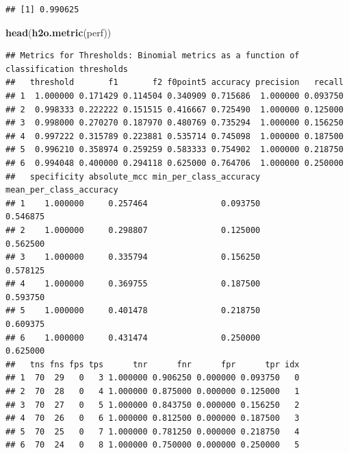 \documentclass[]{article}
\newenvironment{Shaded}{\begin{snugshade}}{\end{snugshade}}
\newcommand{\KeywordTok}[1]{\textcolor[rgb]{0.13,0.29,0.53}{\textbf{{#1}}}}
\newcommand{\DataTypeTok}[1]{\textcolor[rgb]{0.13,0.29,0.53}{{#1}}}
\newcommand{\StringTok}[1]{\textcolor[rgb]{0.31,0.60,0.02}{{#1}}}
\newcommand{\NormalTok}[1]{{#1}}
\begin{document}
\begin{verbatim}
## [1] 0.990625
\end{verbatim}

\begin{Shaded}
\begin{Highlighting}[]
\KeywordTok{head}\NormalTok{(}\KeywordTok{h2o.metric}\NormalTok{(perf))}
\end{Highlighting}
\end{Shaded}

\begin{verbatim}
## Metrics for Thresholds: Binomial metrics as a function of classification thresholds
##   threshold       f1       f2 f0point5 accuracy precision   recall
## 1  1.000000 0.171429 0.114504 0.340909 0.715686  1.000000 0.093750
## 2  0.998333 0.222222 0.151515 0.416667 0.725490  1.000000 0.125000
## 3  0.998000 0.270270 0.187970 0.480769 0.735294  1.000000 0.156250
## 4  0.997222 0.315789 0.223881 0.535714 0.745098  1.000000 0.187500
## 5  0.996210 0.358974 0.259259 0.583333 0.754902  1.000000 0.218750
## 6  0.994048 0.400000 0.294118 0.625000 0.764706  1.000000 0.250000
##   specificity absolute_mcc min_per_class_accuracy mean_per_class_accuracy
## 1    1.000000     0.257464               0.093750                0.546875
## 2    1.000000     0.298807               0.125000                0.562500
## 3    1.000000     0.335794               0.156250                0.578125
## 4    1.000000     0.369755               0.187500                0.593750
## 5    1.000000     0.401478               0.218750                0.609375
## 6    1.000000     0.431474               0.250000                0.625000
##   tns fns fps tps      tnr      fnr      fpr      tpr idx
## 1  70  29   0   3 1.000000 0.906250 0.000000 0.093750   0
## 2  70  28   0   4 1.000000 0.875000 0.000000 0.125000   1
## 3  70  27   0   5 1.000000 0.843750 0.000000 0.156250   2
## 4  70  26   0   6 1.000000 0.812500 0.000000 0.187500   3
## 5  70  25   0   7 1.000000 0.781250 0.000000 0.218750   4
## 6  70  24   0   8 1.000000 0.750000 0.000000 0.250000   5
\end{verbatim}

\begin{Shaded}
\end{Shaded}
\end{document}
